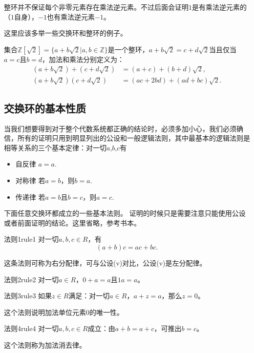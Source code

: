 整环并不保证每个非零元素存在乘法逆元素。不过后面会证明$1$是有乘法逆元素的（$1$自身），$-1$也有乘法逆元素$-1$。

这里应该多举一些交换环和整环的例子。

集合$\mathbb{Z}[\sqrt{2}] = \{a+b\sqrt{2} | a,b \in \mathbb{Z}\}$是一个整环，$a+b\sqrt{2}=c+d\sqrt{2}$当且仅当$a=c$且$b=d$，加法和乘法分别定义为：
\[
\begin{aligned}
(a + b\sqrt{2}) + (c + d\sqrt{2}) &= (a+c) + (b+d)\sqrt{2}, \\
(a + b\sqrt{2})(c + d\sqrt{2})&=(ac+2bd)+(ad+bc)\sqrt{2}.
\end{aligned}
\]

\subsection{交换环的基本性质}
当我们想要得到对于整个代数系统都正确的结论时，必须多加小心，我们必须确信，所有的证明只用到明显列出的公设和一般逻辑法则，其中最基本的逻辑法则是相等关系的三个基本定律：对一切$a$,$b$,$c$有
\begin{itemize}
\item 自反律 $a=a$.
\item 对称律 若$a=b$，则$b=a$.
\item 传递律 若$a=b$且$b=c$，则$a=c$.
\end{itemize}

下面任意交换环都成立的一些基本法则。 证明的时候只是需要注意只能使用公设或者前面证明的结论。这里省略，参考书本。

\begin{corollary}{法则1}{rule1}
对一切$a,b,c \in R$，有
\[
(a+b)c = ac + bc.
\]
\end{corollary}

这条法则可称为右分配律，可与公设(v)对比，公设(v)是左分配律。

\begin{corollary}{法则2}{rule2}
对一切$a \in R$，$0+a=a$且$1a=a$。
\end{corollary}

\begin{corollary}{法则3}{rule3}
如果$z \in R$满足：对一切$a \in R$，$a+z=a$，那么$z=0$。
\end{corollary}
这个法则说明加法单位元素0的唯一性。

\begin{corollary}{法则4}{rule4}
对一切$a, b, c \in R$成立：由$a+b=a+c$，可推出$b=c$。
\end{corollary}
这个法则称为加法消去律。

